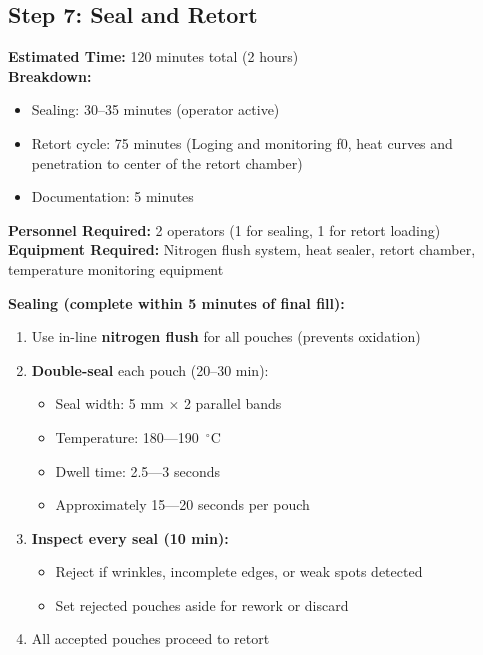 {%

\subsection*{Step 7: Seal and Retort}

\textbf{Estimated Time:} 120 minutes total (2 hours) \\
\textbf{Breakdown:}
\begin{itemize}
\item Sealing: 30--35 minutes (operator active)
\item Retort cycle: 75 minutes (Loging and monitoring f0, heat curves and penetration to center of the retort chamber)
\item Documentation: 5 minutes
\end{itemize}
\textbf{Personnel Required:} 2 operators (1 for sealing, 1 for retort loading) \\
\textbf{Equipment Required:} Nitrogen flush system, heat sealer, retort chamber, temperature monitoring equipment

\vspace{0.5em}
\textbf{Sealing (complete within 5 minutes of final fill):}
\begin{enumerate}[leftmargin=1.5em]
\textbf{Log Start Time in Timesheet:} \_\_\_\_\_
\textbf Ensure less than 5 minutes between End Time in Step 6 and Start Time in Step 7. 
\item Use in-line \textbf{nitrogen flush} for all pouches (prevents oxidation)
\item \textbf{Double-seal} each pouch (20--30 min):
  \begin{itemize}
  \item Seal width: 5 mm $\times$ 2 parallel bands
  \item Temperature: 180---190~$^\circ$C
  \item Dwell time: 2.5---3 seconds
  \item Approximately 15---20 seconds per pouch
  \end{itemize}
\item \textbf{Inspect every seal (10 min):}
  \begin{itemize}
  \item Reject if wrinkles, incomplete edges, or weak spots detected
  \item Set rejected pouches aside for rework or discard
  \end{itemize}
\item All accepted pouches proceed to retort
\end{enumerate}

}
